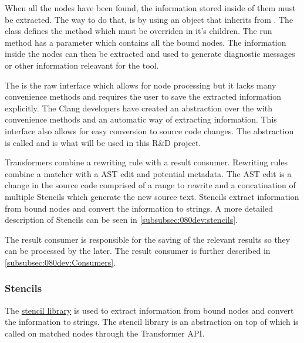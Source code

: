 When all the nodes have been found, the information stored inside of them must be extracted. The way to do that, is by using an object that inherits from . The  class defines the  method which must be overriden in it's children. The run method has a  parameter which contains all the bound nodes. The information inside the nodes can then be extracted and used to generate diagnostic messages or other information releavant for the tool.

The  is the raw interface which allows for node processing but it lacks many convenience methods and requires the user to save the extracted information explicitly. The Clang developers have created an abstraction over the  with convenience methods and an automatic way of extracting information. This interface also allows for easy conversion to source code changes. The abstraction is called  and is what will be used in this R\&D project.

Transformers combine a rewriting rule with a result consumer. Rewriting rules combine a matcher with a AST edit and potential metadata. The AST edit is a change in the source code comprised of a range to rewrite and a concatination of multiple Stencils which generate the new source text. Stencils extract information from bound nodes and convert the information to strings. A more detailed description of Stencils can be seen in \cref{subsubsec:080dev:stencils}.

The result consumer is responsible for the saving of the relevant results so they can be processed by the  later. The result consumer is further described in \cref{subsubsec:080dev:Consumers}.

\subsubsection*{Stencils} \label{subsubsec:080dev:stencils}

The \href{https://github.com/llvm/llvm-project/blob/main/clang/include/clang/Tooling/Transformer/Stencil.h}{stencil library} is used to extract information from bound nodes and convert the information to strings.  The stencil library is an abstraction on top of  which is called on matched nodes through the Transformer API. 

